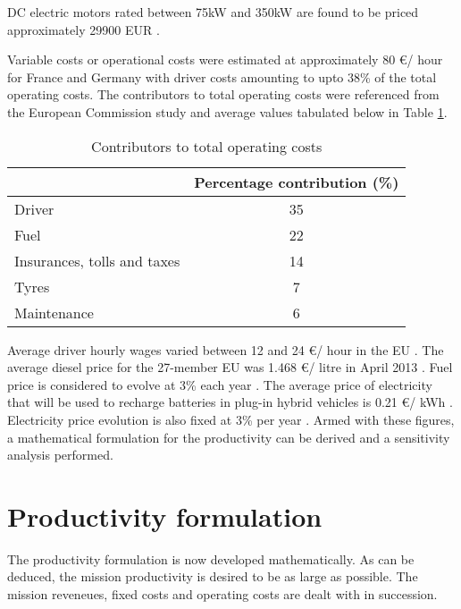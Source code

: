 \documentclass[ExampleMasters.tex]{subfiles}
\begin{document}
		DC electric motors rated between 75kW and 350kW are found to be priced approximately 29900 EUR \cite{EuPLot30Motors}.

		Variable costs or operational costs were estimated at approximately 80 \euro / hour for France and Germany \cite{EuAECOM1} with driver costs amounting to upto 38\% of the total operating costs. The contributors to total operating costs were referenced from the European Commission study \cite[T.~7b]{EuAECOM2} and average values tabulated below in Table \ref{table:OperatingCostContributors}.\\

		\begin{table}[ht]
			\centering 
			\begin{tabular}{l c}
				\hline
				\ & Percentage contribution (\%)\\
				\hline
			    Driver  & 35\\
			    Fuel  & 22\\
			    Insurances, tolls and taxes & 14\\
			    Tyres & 7\\
			    Maintenance & 6\\
				\hline 
			\end{tabular}
			\caption{Contributors to total operating costs \cite[T.~7b]{EuAECOM2}} 
			\label{table:OperatingCostContributors} 
		\end{table}

		Average driver hourly wages varied between 12 and 24 \euro / hour in the EU \cite[T.~7.2]{EuAECOM1}. The average diesel price for the 27-member EU was 1.468 \euro / litre in April 2013 \cite[T.~7.3]{EuAECOM1}. Fuel price is considered to evolve at 3\% each year \cite[C.~14]{LongHaulFH}. The average price of electricity that will be used to recharge batteries in plug-in hybrid vehicles is 0.21 \euro / kWh \cite{EUelectricity}. Electricity price evolution is also fixed at 3\% per year \cite[T.~14]{LongHaulFH}. Armed with these figures, a mathematical formulation for the productivity can be derived and a sensitivity analysis performed.  

	\section{Productivity formulation}

		The productivity formulation is now developed mathematically. As can be deduced, the mission productivity is desired to be as large as possible. The mission reveneues, fixed costs and operating costs are dealt with in succession.
\end{document}
